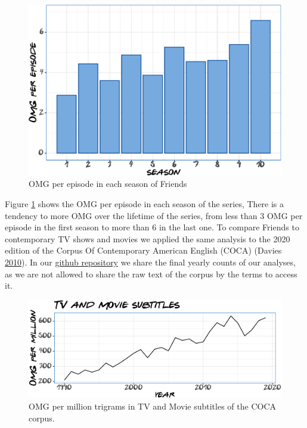 \documentclass[]{article}
\begin{document}
\begin{figure}

{\centering \includegraphics{Friends_HPS_pdf_files/figure-latex/episodes-1} 

}

\caption{OMG per episode in each season of Friends}\label{fig:episodes}
\end{figure}

Figure \ref{fig:episodes} shows the OMG per episode in each season of the series, There is a tendency to more OMG over the lifetime of the series, from less than 3 OMG per episode in the first season to more than 6 in the last one. To compare Friends to contemporary TV shows and movies we applied the same analysis to the 2020 edition of the Corpus Of Contemporary American English (COCA) (Davies \protect\hyperlink{ref-davies2010corpus}{2010}). In our \href{https://github.com/dgarcia-eu/Friends_HPS2020}{github repository} we share the final yearly counts of our analyses, as we are not allowed to share the raw text of the corpus by the terms to access it.

\begin{figure}

{\centering \includegraphics{Friends_HPS_pdf_files/figure-latex/tvm-1} 

}

\caption{OMG per million trigrams in TV and Movie subtitles of the COCA corpus.}\label{fig:tvm}
\end{figure}
\end{document}

